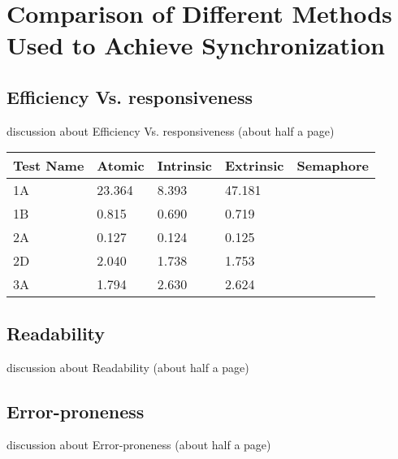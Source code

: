 \documentclass[11pt]{article}
\begin{document}
\maketitle
\tableofcontents
\thispagestyle{empty}
\pagebreak
\setcounter{page}{1}
\section{Comparison of Different Methods Used to Achieve Synchronization}

\subsection{Efficiency Vs. responsiveness}
discussion about Efficiency Vs. responsiveness (about half a page)

\begin{table}[]
\begin{tabular}{|l|l|l|l|l|}
\hline
Test Name & Atomic & Intrinsic & Extrinsic & Semaphore \\ \hline
1A        & 23.364 & 8.393     & 47.181    &           \\ \hline
1B        & 0.815  & 0.690     & 0.719     &           \\ \hline
2A        & 0.127  & 0.124     & 0.125     &           \\ \hline
2D        & 2.040  & 1.738     & 1.753     &           \\ \hline
3A        & 1.794  & 2.630     & 2.624     &           \\ \hline
\end{tabular}
\end{table}

\subsection{Readability}
discussion about  Readability (about half a page)
\subsection{Error-proneness}
discussion about Error-proneness (about half a page)




\end{document}
